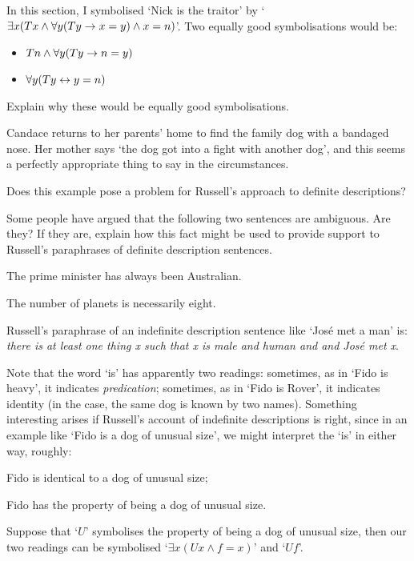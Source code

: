\problempart
In this section, I symbolised `Nick is the traitor' by `$\exists x (Tx \wedge \forall y(Ty \rightarrow x = y) \wedge x = n)$'. Two equally good symbolisations would be:
	\begin{itemize}
		\item $Tn \wedge \forall y(Ty \rightarrow n = y)$
		\item $\forall y(Ty \leftrightarrow y = n)$
	\end{itemize}
Explain why these would be equally good symbolisations.

\problempart
Candace returns to her parents' home to find the family dog with a bandaged nose. Her mother says `the dog got into a fight with another dog', and this seems a perfectly appropriate thing to say in the circumstances. 

Does this example pose a problem for Russell's approach to definite descriptions?




\problempart
Some people have argued that the following two sentences are ambiguous. Are they? If they are, explain how this fact might be used to provide support to Russell's paraphrases of definite description sentences. \begin{earg}
	\item The prime minister has always been Australian.
	\item The number of planets is necessarily eight.
\end{earg}

\problempart
Russell's paraphrase of an indefinite description \label{indefs} sentence like `José met a man' is: \emph{there is at least one thing x such that x is male and human and and José met x}. 

Note that the word `is' has apparently two readings: sometimes, as in `Fido is heavy', it indicates \emph{predication}; sometimes, as in `Fido is Rover', it indicates identity (in the case, the same dog is known by two names). Something interesting arises if Russell's account of indefinite descriptions is right, since in an example like `Fido is a dog of unusual size', we might interpret the `is' in either way, roughly:
\begin{earg}
 \item Fido is identical to a dog of unusual size;
 \item Fido has the property of being a dog of unusual size.
 \end{earg} Suppose that `$U$' symbolises the property of being a dog of unusual size, then our two readings can be symbolised `$\exists x (Ux \wedge f=x)$' and `$Uf$'. 

